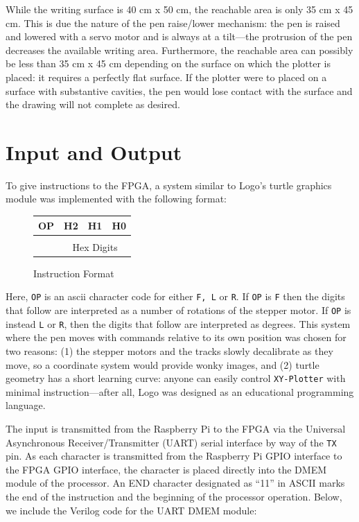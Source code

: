\documentclass[12pt]{article}
\begin{document}
While the writing surface is 40 cm x 50 cm, the reachable area is only 35 cm x 45 cm. This is due the nature of the pen raise/lower mechanism: the pen is raised and lowered with a servo motor and is always at a tilt---the protrusion of the pen decreases the available writing area. Furthermore, the reachable area can possibly be less than 35 cm x 45 cm depending on the surface on which the plotter is placed: it requires a perfectly flat surface. If the plotter were to placed on a surface with substantive cavities, the pen would lose contact with the surface and the drawing will not complete as desired.

\section{Input and Output}
To give instructions to the FPGA, a system similar to Logo's turtle graphics module was implemented with the following format:

\begin{figure}[ht!]
\centering
\begin{tabular}{|c|c|c|c|} \hline
OP & H2 & H1 & H0 \\ \hline
\multicolumn{1}{c}{} & \multicolumn{3}{p{2cm}}{\raisebox{.5\baselineskip}{$\underbrace{\hspace{2.45cm}}$}} \\
\multicolumn{1}{c}{} & \multicolumn{3}{c}{Hex Digits} \\
\end{tabular}
\caption{Instruction Format}
\end{figure}

Here, {\tt OP} is an ascii character code for either {\tt F, L} or {\tt R}. If {\tt OP} is {\tt F} then the digits that follow are interpreted as a number of rotations of the stepper motor. If {\tt OP} is instead {\tt L} or {\tt R}, then the digits that follow are interpreted as degrees. This system where the pen moves with commands relative to its own position was chosen for two reasons: (1) the stepper motors and the tracks slowly decalibrate as they move, so a coordinate system would provide wonky images, and (2) turtle geometry has a short learning curve: anyone can easily control {\tt XY-Plotter} with minimal instruction---after all, Logo was designed as an educational programming language.

The input is transmitted from the Raspberry Pi to the FPGA via the Universal Asynchronous Receiver/Transmitter (UART) serial interface by way of the {\tt TX} pin. As each character is transmitted from the Raspberry Pi GPIO interface to the FPGA GPIO interface, the character is placed directly into the DMEM module of the processor. An END character designated as ``11'' in ASCII marks the end of the instruction and the beginning of the processor operation. Below, we include the Verilog code for the UART DMEM module:
\end{document}
